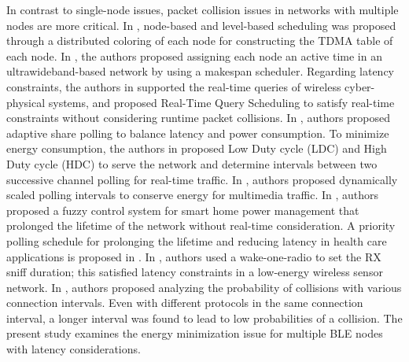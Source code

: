 \documentclass[10pt,journal,compsoc]{IEEEtran}
\begin{document}
In contrast to single-node issues, packet collision issues in networks with multiple nodes are more critical. In \cite{ergen2010tdma}, node-based and level-based scheduling was proposed through a distributed coloring of each node for constructing the TDMA table of each node. In \cite{sadi2013optimal}, the authors proposed assigning each node an active time in an ultrawideband-based network by using a makespan scheduler. Regarding latency constraints, the authors in \cite{ chipara2013real} supported the real-time queries of wireless cyber-physical systems, and proposed Real-Time Query Scheduling to satisfy real-time constraints without considering runtime packet collisions. In \cite{perillo2003asp}, authors proposed adaptive share polling to balance latency and power consumption. To minimize energy consumption, the authors in \cite{doudou2013duo} proposed Low Duty cycle (LDC) and High Duty cycle (HDC) to serve the network and determine intervals between two successive channel polling for real-time traffic. In \cite{contreras2011adaptive}, authors proposed dynamically scaled polling intervals to conserve energy for multimedia traffic. In \cite{collotta2015bluetooth}, authors proposed a fuzzy control system for smart home power management that prolonged the lifetime of the network without real-time consideration. A priority polling schedule for prolonging the lifetime and reducing latency in health care applications is proposed in \cite{jacob2015energy}. In \cite{phuong2015real}, authors used a wake-one-radio to set the RX sniff duration; this satisfied latency constraints in a low-energy wireless sensor network. In \cite{osthus2011concurrent}, authors proposed analyzing the probability of collisions with various connection intervals. Even with different protocols in the same connection interval, a longer interval was found to lead to low probabilities of a collision. The present study examines the energy minimization issue for multiple BLE nodes with latency considerations.
\end{document}
